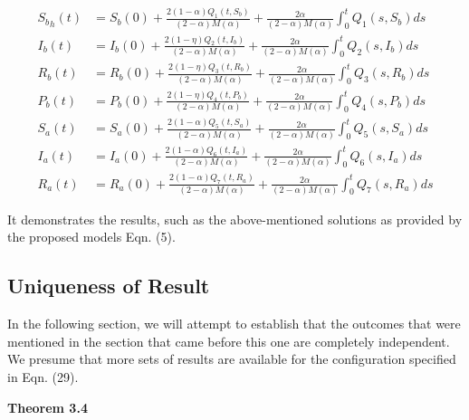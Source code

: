 \documentclass[10pt]{NSP1}
\begin{document}
\begin{equation}
\begin{aligned}
{S_{b}}_{h}(t) &= S_{b}(0) + \frac{2(1 - \alpha)Q_{1}\left( t,S_{b} \right)}{(2 - \alpha)M(\alpha)} + \frac{2\alpha}{(2 - \alpha)M(\alpha)}\int_{0}^{t}{}Q_{1}\left( s,S_{b} \right)ds \\
I_{b}(t) &= I_{b}(0) + \frac{2(1 - \eta)Q_{2}\left( t,I_{b} \right)}{(2 - \alpha)M(\alpha)} + \frac{2\alpha}{(2 - \alpha)M(\alpha)}\int_{0}^{t}{}Q_{2}\left( s,I_{b} \right)ds \\
R_{b}(t) &= R_{b}(0) + \frac{2(1 - \eta)Q_{3}\left( t,R_{b} \right)}{(2 - \alpha)M(\alpha)} + \frac{2\alpha}{(2 - \alpha)M(\alpha)}\int_{0}^{t}{}Q_{3}\left( s,R_{b} \right)ds \\
P_{b}(t) &= P_{b}(0) + \frac{2(1 - \eta)Q_{4}\left( t,P_{b} \right)}{(2 - \alpha)M(\alpha)} + \frac{2\alpha}{(2 - \alpha)M(\alpha)}\int_{0}^{t}{}Q_{4}\left( s,P_{b} \right)ds \\
S_{a}(t) &= S_{a}(0) + \frac{2(1 - \alpha)Q_{5}\left( t,S_{a} \right)}{(2 - \alpha)M(\alpha)} + \frac{2\alpha}{(2 - \alpha)M(\alpha)}\int_{0}^{t}{}Q_{5}\left( s,S_{a} \right)ds \\
I_{a}(t) &= I_{a}(0) + \frac{2(1 - \alpha)Q_{6}\left( t,I_{a} \right)}{(2 - \alpha)M(\alpha)} + \frac{2\alpha}{(2 - \alpha)M(\alpha)}\int_{0}^{t}{}Q_{6}\left( s,I_{a} \right)ds \\
R_{a}(t) &= R_{a}(0) + \frac{2(1 - \alpha)Q_{7}\left( t,R_{a} \right)}{(2 - \alpha)M(\alpha)} + \frac{2\alpha}{(2 - \alpha)M(\alpha)}\int_{0}^{t}{}Q_{7}\left( s,R_{a} \right)ds
\end{aligned}
\end{equation}

\normalsize

It demonstrates the results, such as the above-mentioned solutions as provided by the proposed model\textquotesingle s Eqn. (5).


\subsection{Uniqueness of Result}


In the following section, we will attempt to establish that the outcomes that were mentioned in the section that came before this one are completely independent. We presume that more sets of results are available for the configuration specified in Eqn. (29).




\textbf{Theorem 3.4}
\end{document}
